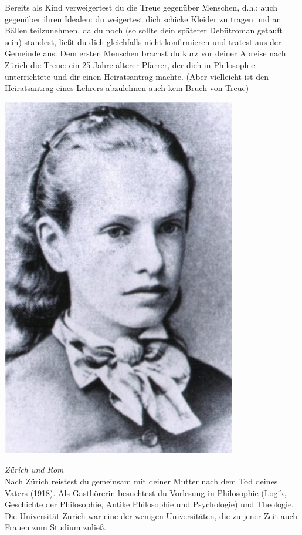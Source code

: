 \documentclass[12pt, a4paper, openany]{report}
\begin{document}
Bereits als Kind verweigertest du die Treue gegenüber Menschen, d.h.: auch gegenüber ihren Idealen:
du weigertest dich schicke Kleider zu tragen und an Bällen teilzunehmen, da du noch  (so sollte dein späterer Debütroman getauft sein) standest, ließt du dich gleichfalls nicht konfirmieren und tratest aus der Gemeinde aus.
Dem ersten Menschen brachst du kurz vor deiner Abreise nach Zürich die Treue: 
ein 25 Jahre älterer Pfarrer, der dich in Philosophie unterrichtete und dir einen Heiratsantrag machte. 
(Aber vielleicht ist den Heiratsantrag eines Lehrers abzulehnen auch kein Bruch von Treue)
\medskip
\begin{center}
  \includegraphics[scale=1.5]{Lou_profil.jpg}
\end{center}
\medskip
\textit{Zürich und Rom}\\
Nach Zürich reistest du gemeinsam mit deiner Mutter nach dem Tod deines Vaters (1918). 
Als Gasthörerin besuchtest du Vorlesung in Philosophie (Logik, Geschichte der Philosophie, Antike Philosophie und Psychologie) und Theologie. 
Die Universität Zürich war eine der wenigen Universitäten, die zu jener Zeit auch Frauen zum Studium zuließ.
\end{document}
